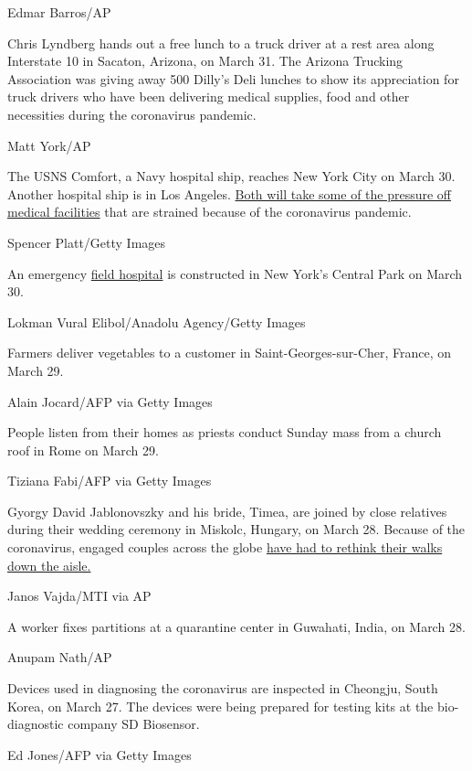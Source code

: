 Edmar Barros/AP

Chris Lyndberg hands out a free lunch to a truck driver at a rest area
along Interstate 10 in Sacaton, Arizona, on March 31. The Arizona
Trucking Association was giving away 500 Dilly's Deli lunches to show
its appreciation for truck drivers who have been delivering medical
supplies, food and other necessities during the coronavirus pandemic.

Matt York/AP

The USNS Comfort, a Navy hospital ship, reaches New York City on March
30. Another hospital ship is in Los Angeles.
\href{https://www.cnn.com/2020/03/27/us/california-hospital-ship-trnd/index.html}{Both
will take some of the pressure off medical facilities} that are strained
because of the coronavirus pandemic.

Spencer Platt/Getty Images

An emergency
\href{https://www.cnn.com/world/live-news/coronavirus-outbreak-03-30-20-intl-hnk/h_f859e8cfde16afd14d2371c7227f0f46}{field
hospital} is constructed in New York's Central Park on March 30.

Lokman Vural Elibol/Anadolu Agency/Getty Images

Farmers deliver vegetables to a customer in Saint-Georges-sur-Cher,
France, on March 29.

Alain Jocard/AFP via Getty Images

People listen from their homes as priests conduct Sunday mass from a
church roof in Rome on March 29.

Tiziana Fabi/AFP via Getty Images

Gyorgy David Jablonovszky and his bride, Timea, are joined by close
relatives during their wedding ceremony in Miskolc, Hungary, on March
28. Because of the coronavirus, engaged couples across the globe
\href{https://www.cnn.com/2020/03/28/us/couples-livestreaming-weddings-wellness-trnd/index.html}{have
had to rethink their walks down the aisle.}

Janos Vajda/MTI via AP

A worker fixes partitions at a quarantine center in Guwahati, India, on
March 28.

Anupam Nath/AP

Devices used in diagnosing the coronavirus are inspected in Cheongju,
South Korea, on March 27. The devices were being prepared for testing
kits at the bio-diagnostic company SD Biosensor.

Ed Jones/AFP via Getty Images

